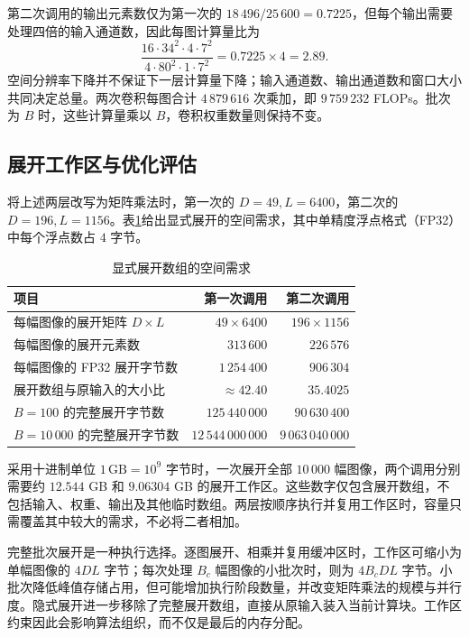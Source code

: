 第二次调用的输出元素数仅为第一次的 $18\,496/25\,600=0.7225$，但每个输出需要处理四倍的输入通道数，因此每图计算量比为
\begin{equation}
  \frac{16\cdot34^2\cdot4\cdot7^2}
       {4\cdot80^2\cdot1\cdot7^2}
  =0.7225\times4=2.89.
  \label{l11:eq:project_compute_ratio}
\end{equation}
空间分辨率下降并不保证下一层计算量下降；输入通道数、输出通道数和窗口大小共同决定总量。两次卷积每图合计 $4\,879\,616$ 次乘加，即 $9\,759\,232$ FLOPs。批次为 $B$ 时，这些计算量乘以 $B$，卷积权重数量则保持不变。

\subsection{展开工作区与优化评估}
\label{l11:subsec:project_workspace}

将上述两层改写为矩阵乘法时，第一次的 $D=49,L=6400$，第二次的 $D=196,L=1156$。表\ref{l11:tab:project_workspace}给出显式展开的空间需求，其中单精度浮点格式（FP32）中每个浮点数占 $4$ 字节。

\begin{table}[htbp]
\centering
\small
\caption{显式展开数组的空间需求}
\label{l11:tab:project_workspace}
\begin{tabularx}{\linewidth}{Xrr}
\toprule
项目 & 第一次调用 & 第二次调用\\
\midrule
每幅图像的展开矩阵 $D\times L$ & $49\times6400$ & $196\times1156$\\
每幅图像的展开元素数 & $313\,600$ & $226\,576$\\
每幅图像的 FP32 展开字节数 & $1\,254\,400$ & $906\,304$\\
展开数组与原输入的大小比 & $\approx42.40$ & $35.4025$\\
$B=100$ 的完整展开字节数 & $125\,440\,000$ & $90\,630\,400$\\
$B=10\,000$ 的完整展开字节数 & $12\,544\,000\,000$ & $9\,063\,040\,000$\\
\bottomrule
\end{tabularx}
\end{table}

采用十进制单位 $1\,\mathrm{GB}=10^9$ 字节时，一次展开全部 $10\,000$ 幅图像，两个调用分别需要约 $12.544$ GB 和 $9.06304$ GB 的展开工作区。这些数字仅包含展开数组，不包括输入、权重、输出及其他临时数组。两层按顺序执行并复用工作区时，容量只需覆盖其中较大的需求，不必将二者相加。

完整批次展开是一种执行选择。逐图展开、相乘并复用缓冲区时，工作区可缩小为单幅图像的 $4DL$ 字节；每次处理 $B_c$ 幅图像的小批次时，则为 $4B_cDL$ 字节。小批次降低峰值存储占用，但可能增加执行阶段数量，并改变矩阵乘法的规模与并行度。隐式展开进一步移除了完整展开数组，直接从原输入装入当前计算块。工作区约束因此会影响算法组织，而不仅是最后的内存分配。

